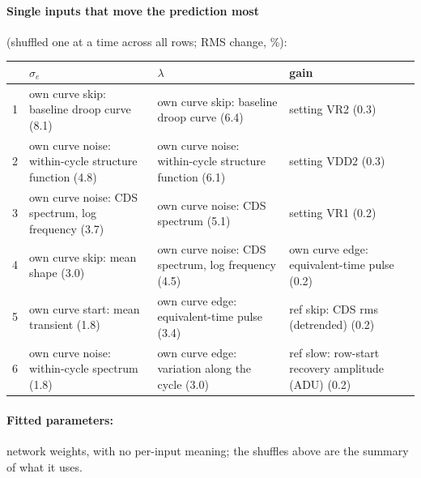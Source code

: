 \paragraph{Single inputs that move the prediction most} (shuffled one at a time across all rows; RMS change, \%):
\begin{center}\footnotesize
\begin{tabular}{rp{}p{}p{}}
\toprule
 & $\sigma_e$ & $\lambda$ & gain \\
\midrule
1 & own curve skip: baseline droop curve (8.1) & own curve skip: baseline droop curve (6.4) & setting VR2 (0.3) \\
2 & own curve noise: within-cycle structure function (4.8) & own curve noise: within-cycle structure function (6.1) & setting VDD2 (0.3) \\
3 & own curve noise: CDS spectrum, log frequency (3.7) & own curve noise: CDS spectrum (5.1) & setting VR1 (0.2) \\
4 & own curve skip: mean shape (3.0) & own curve noise: CDS spectrum, log frequency (4.5) & own curve edge: equivalent-time pulse (0.2) \\
5 & own curve start: mean transient (1.8) & own curve edge: equivalent-time pulse (3.4) & ref skip: CDS rms (detrended) (0.2) \\
6 & own curve noise: within-cycle spectrum (1.8) & own curve edge: variation along the cycle (3.0) & ref slow: row-start recovery amplitude (ADU) (0.2) \\
\bottomrule
\end{tabular}
\end{center}
\paragraph{Fitted parameters:} network weights, with no per-input meaning; the shuffles above are the summary of what it uses.
